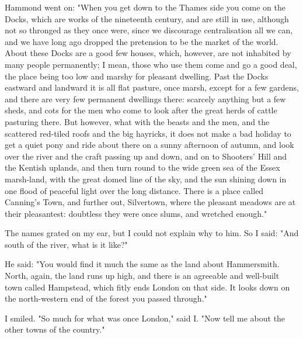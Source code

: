 Hammond went on: "When you get down to the Thames side you come on the
Docks, which are works of the nineteenth century, and are still in use,
although not so thronged as they once were, since we discourage
centralisation all we can, and we have long ago dropped the pretension
to be the market of the world. About these Docks are a good few houses,
which, however, are not inhabited by many people permanently; I mean,
those who use them come and go a good deal, the place being too low and
marshy for pleasant dwelling. Past the Docks eastward and landward it is
all flat pasture, once marsh, except for a few gardens, and there are
very few permanent dwellings there: scarcely anything but a few sheds,
and cots for the men who come to look after the great herds of cattle
pasturing there. But however, what with the beasts and the men, and the
scattered red-tiled roofs and the big hayricks, it does not make a bad
holiday to get a quiet pony and ride about there on a sunny afternoon of
autumn, and look over the river and the craft passing up and down, and
on to Shooters' Hill and the Kentish uplands, and then turn round to the
wide green sea of the Essex marsh-land, with the great domed line of the
sky, and the sun shining down in one flood of peaceful light over the
long distance. There is a place called Canning's Town, and further out,
Silvertown, where the pleasant meadows are at their pleasantest:
doubtless they were once slums, and wretched enough."

The names grated on my ear, but I could not explain why to him. So I
said: "And south of the river, what is it like?"

He said: "You would find it much the same as the land about Hammersmith.
North, again, the land runs up high, and there is an agreeable and
well-built town called Hampstead, which fitly ends London on that side.
It looks down on the north-western end of the forest you passed
through."

I smiled. "So much for what was once London," said I. "Now tell me about
the other towns of the country."

